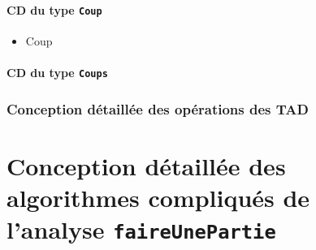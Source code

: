 \documentclass[11pt]{article}
\begin{document}
\subsection{CD du type \tt{Coup}}
\begin{itemize}\item
\begin{algorithme}
\begin{enregistrement}{Coup}
\end{enregistrement}
\end{algorithme}
\end{itemize}

\subsection{CD du type \tt{Coups}}
\begin{itemize}
\end{itemize}

\section{Conception détaillée des opérations des TAD}

\part{Conception détaillée des algorithmes compliqués de l'analyse \tt{faireUnePartie}}
\setcounter{section}{0}
\end{document}
